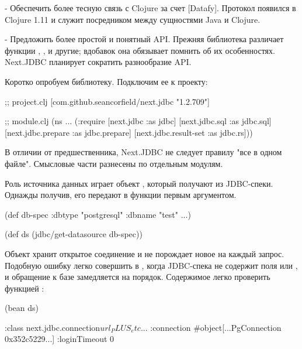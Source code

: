 - Обеспечить более тесную связь с Clojure за счет [Datafy]. Протокол появился в Clojure 1.11 и служит посредником между сущностями Java и Clojure.

- Предложить более простой и понятный API. Прежняя библиотека различает функции , ,  и другие; вдобавок она обязывает помнить об их особенностях. Next.JDBC планирует сократить разнообразие API.

Коротко опробуем библиотеку. Подключим ее к проекту:

\begin{english}
  \begin{clojure}
;; project.clj
[com.github.seancorfield/next.jdbc "1.2.709"]

;; module.clj
(ns ...
  (:require
   [next.jdbc :as jdbc]
   [next.jdbc.sql :as jdbc.sql]
   [next.jdbc.prepare :as jdbc.prepare]
   [next.jdbc.result-set :as jdbc.rs]))
  \end{clojure}
\end{english}

В отличии от предшественника, Next.JDBC не следует правилу "все в одном файле". Смысловые части разнесены по отдельным модулям.

Роль источника данных играет объект , который получают из JDBC-спеки. Однажды получив, его передают в функции первым аргументом.

\begin{english}
  \begin{clojure}
(def db-spec {:dbtype "postgresql" :dbname "test" ...})

(def ds (jdbc/get-datasource db-spec))
  \end{clojure}
\end{english}

Объект  хранит открытое соединение и не порождает новое на каждый запрос. Подобную ошибку легко совершить в , когда JDBC-спека не содержит поля  или , и обращение к базе замедляется на порядок. Содержимое  легко проверить функцией :

\begin{english}
  \begin{clojure}
(bean ds)

{:class next.jdbc.connection$url_PLUS_etc$...
 :connection #object[...PgConnection 0x352c5229...]
 :loginTimeout 0}
  \end{clojure}
\end{english}

